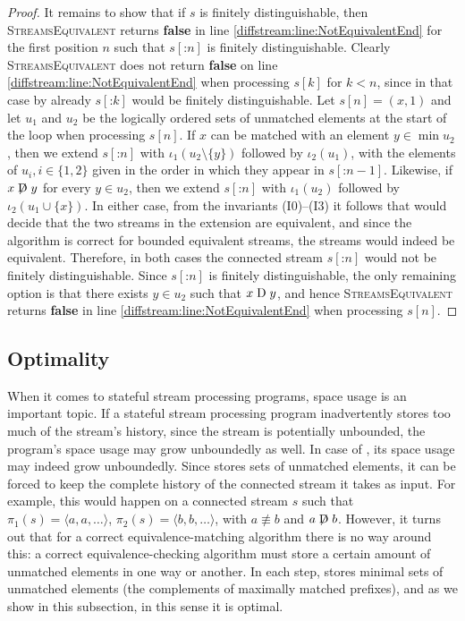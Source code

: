 \begin{proof}
  It remains
  to show that if $s$ is finitely distinguishable, then \textsc{StreamsEquivalent} returns \textbf{false} in line \ref{diffstream:line:NotEquivalentEnd} for the
  first position $n$ such that $s[\mathbin{:} n]$ is finitely distinguishable. Clearly \textsc{StreamsEquivalent} does not return \textbf{false} on line \ref{diffstream:line:NotEquivalentEnd} when processing $s[k]$
  for $k<n$, since in that case by  already $s[\mathbin{:} k]$ would be finitely distinguishable. Let $s[n]=(x,1)$ and let $u_1$ and $u_2$ be the logically ordered sets of unmatched elements at the start of
  the loop when processing $s[n]$.
  If $x$ can be matched with an element $y\in \min u_2$, then we
  extend $s[\mathbin{:} n]$ with $\iota_1(u_2\setminus\{y\})$
  followed by $\iota_2(u_1)$, with the elements of $u_i, i\in\{1,2\}$
  given in the order in
  which they appear in $s[\mathbin{:} {n-1}]$.
  Likewise, if $x\not\mathrel{\mathrm{D}} y$ for every $y\in u_2$, then we extend $s[\mathbin{:} n]$
  with
  $\iota_1(u_2)$ followed by $\iota_2(u_1\cup\{x\})$. In either case, from
  the invariants
  (I0)--(I3) it follows that  would decide that the
  two streams in the
  extension are equivalent, and since the algorithm is correct
  for bounded equivalent streams, the streams would indeed be equivalent.
  Therefore, in both cases the connected stream $s[\mathbin{:} n]$ would not be
  finitely distinguishable. Since $s[\mathbin{:} n]$ is finitely distinguishable,
  the only remaining option is that there exists $y\in u_2$ such that $x\mathrel{\mathrm{D}} y$, and hence \textsc{StreamsEquivalent} returns \textbf{false} in line \ref{diffstream:line:NotEquivalentEnd} when processing $s[n]$.
\end{proof}

\subsection{Optimality}
\label{diffstream:sec:optimality}

When it comes to stateful stream processing programs, space usage is an
important topic. If a stateful stream processing program inadvertently stores
too much of the stream's history, since the stream is potentially unbounded,
the program's space usage may grow unboundedly as well. In case of
, its space usage may indeed grow unboundedly. Since
 stores sets of unmatched elements, it can be forced to
keep the complete history of the connected stream it takes as input. For example,
this would happen on a connected stream $s$ such that $\pi_1(s)=\langle a, a,
\ldots\rangle$, $\pi_2(s)=\langle b, b, \ldots\rangle$, with $a\not\equiv b$ and $a\not\mathrel{\mathrm{D}} b$.
However, it turns out that for a correct equivalence-matching algorithm there
is no way around this: a correct
equivalence-checking algorithm must store a certain amount
of unmatched elements in one way or another. In each step,
 stores
minimal sets of unmatched elements (the complements of maximally matched
prefixes), and as we show in this subsection, in this sense it is optimal.



